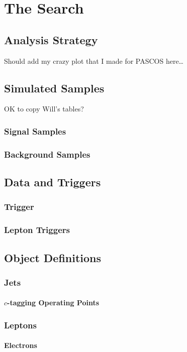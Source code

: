 \chapter{The \sctoc Search}

\section{Analysis Strategy}
Should add my crazy plot that I made for PASCOS here\ldots

\section{Simulated Samples}
OK to copy Will's tables?
\subsection{Signal Samples}
\subsection{Background Samples}

\section{Data and Triggers}
\subsection{\met Trigger}
\subsection{Lepton Triggers}

\section{Object Definitions}
\subsection{Jets}
\subsubsection{$c$-tagging Operating Points}
\subsection{Leptons}
\subsubsection{Electrons}
